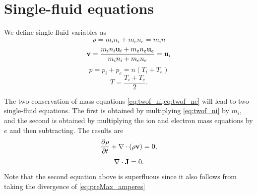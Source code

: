 \documentclass[a4paper,11pt]{report}
\begin{document}
\section{Single-fluid equations}
We define single-fluid variables as
\begin{equation}
    \rho = m_i n_i + m_e n_e = m_i n
\end{equation}
\begin{equation}
    \mathbf{v} = \frac{m_i n_i \mathbf{u}_i + m_e n_e \mathbf{u}_e}{m_i n_i + m_e n_e} = \mathbf{u}_i
\end{equation}
\begin{equation}
    p = p_i + p_e = n (T_i + T_e)
\end{equation}
\begin{equation}
    T = \frac{T_i + T_e}{2}.
\end{equation}

The two conservation of mass equations \cref{eq:twof_ni,eq:twof_ne} will lead to two single-fluid equations. The first is obtained by multiplying \cref{eq:twof_ni} by $m_i$, and the second is obtained by multiplying the ion and electron mass equations by $e$ and then subtracting. The results are
\begin{equation}
    \frac{\partial \rho}{\partial t} + \nabla \cdot (\rho \mathbf{v}) = 0,
\end{equation}
\begin{equation}
    \nabla \cdot \mathbf{J} = 0.
\end{equation}
Note that the second equation above is superfluous since it also follows from taking the divergence of \cref{eq:preMax_amperes}
\end{document}
